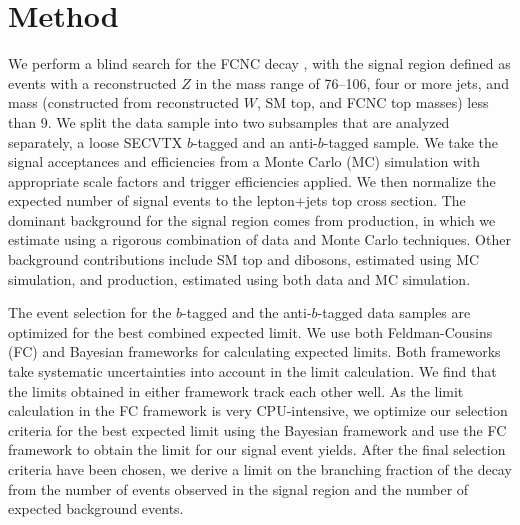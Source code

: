 \section{Method}
We perform a blind search for the FCNC decay \tZq, with the signal
region defined as events with a reconstructed $Z$ in the mass range of
76--106\gevcsq, four or more jets, and mass \chisq (constructed from
reconstructed $W$, SM top, and FCNC top masses) less than 9. We split
the data sample into two subsamples that are analyzed separately, a
loose SECVTX $b$-tagged and an anti-$b$-tagged sample. We take the signal
acceptances and efficiencies from a Monte Carlo (MC) simulation with
appropriate scale factors and trigger efficiencies applied. We then 
normalize the expected number of signal events to the lepton+jets
top cross section. The dominant background for the signal
region comes from \sm \Zj production, in which we estimate using a rigorous 
combination of data and Monte Carlo techniques. Other background contributions 
include SM top and dibosons, estimated using MC simulation, and \Wj production,
estimated using both data and MC simulation.

The event selection for the $b$-tagged and the anti-$b$-tagged data samples
are optimized for the best combined expected limit. We use both
Feldman-Cousins (FC) and Bayesian frameworks for calculating expected
limits. Both frameworks take systematic uncertainties into account 
in the limit calculation. We find that the limits obtained in either 
framework track each other well. As the limit calculation in the FC 
framework is very CPU-intensive, we optimize our selection criteria 
for the best expected limit using the Bayesian framework and use the 
FC framework to obtain the limit for our signal event yields.  After
the final selection criteria have been chosen, we derive a limit on
the branching fraction of the decay \tZq from the number of events
observed in the signal region and the number of expected background
events.
